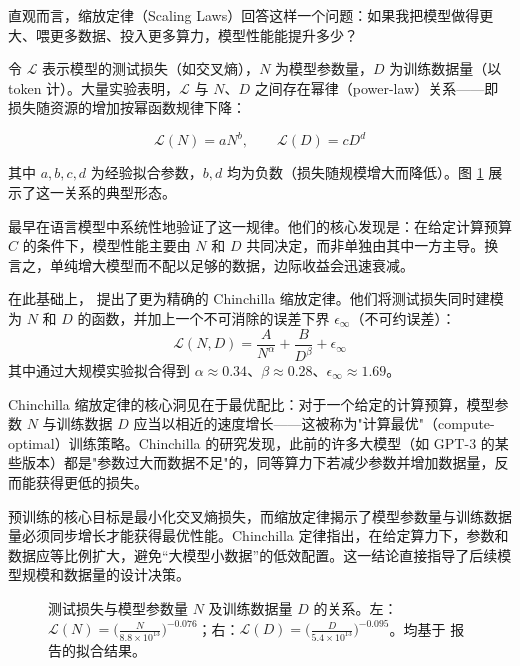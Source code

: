 直观而言，缩放定律（Scaling Laws）回答这样一个问题：如果我把模型做得更大、喂更多数据、投入更多算力，模型性能能提升多少？

令 $\mathcal{L}$ 表示模型的测试损失（如交叉熵），$N$ 为模型参数量，$D$ 为训练数据量（以 token 计）。大量实验表明，$\mathcal{L}$ 与 $N$、$D$ 之间存在幂律（power-law）关系——即损失随资源的增加按幂函数规律下降：

\begin{equation}
  \mathcal{L}(N) = aN^{b}, \qquad \mathcal{L}(D) = cD^{d}
  \label{eq:scaling-power-law-basic}
\end{equation}

其中 $a,b,c,d$ 为经验拟合参数，$b,d$ 均为负数（损失随规模增大而降低）。图 \ref{fig:power-law-scaling-for-model-size-and-dataset-size} 展示了这一关系的典型形态。

\cite{kaplan-etal:2020scaling} 最早在语言模型中系统性地验证了这一规律。他们的核心发现是：在给定计算预算 $C$ 的条件下，模型性能主要由 $N$ 和 $D$ 共同决定，而非单独由其中一方主导。换言之，单纯增大模型而不配以足够的数据，边际收益会迅速衰减。

在此基础上，\cite{hoffmann-etal:2022training} 提出了更为精确的 Chinchilla 缩放定律。他们将测试损失同时建模为 $N$ 和 $D$ 的函数，并加上一个不可消除的误差下界 $\epsilon_{\infty}$（不可约误差）：
\begin{equation}
  \mathcal{L}(N,D) = \frac{A}{N^{\alpha}} + \frac{B}{D^{\beta}} + \epsilon_{\infty}
  \label{eq:scaling-chinchilla}
\end{equation}
其中通过大规模实验拟合得到 $\alpha \approx 0.34$、$\beta \approx 0.28$、$\epsilon_{\infty} \approx 1.69$。

Chinchilla 缩放定律的核心洞见在于最优配比：对于一个给定的计算预算，模型参数 $N$ 与训练数据 $D$ 应当以相近的速度增长——这被称为"计算最优"（compute-optimal）训练策略。Chinchilla 的研究发现，此前的许多大模型（如 GPT-3 的某些版本）都是"参数过大而数据不足"的，同等算力下若减少参数并增加数据量，反而能获得更低的损失。

\begin{importantnote}
预训练的核心目标是最小化交叉熵损失，而缩放定律揭示了模型参数量与训练数据量必须同步增长才能获得最优性能。Chinchilla 定律指出，在给定算力下，参数和数据应等比例扩大，避免“大模型小数据”的低效配置。这一结论直接指导了后续模型规模和数据量的设计决策。
\end{importantnote}

\begin{figure}[!t]
\centering

\caption{测试损失与模型参数量 $N$ 及训练数据量 $D$ 的关系。左：$\mathcal{L}(N) = \big( \frac{N}{8.8 \times 10^{13}} \big)^{-0.076}$；右：$\mathcal{L}(D) = \big( \frac{D}{5.4 \times 10^{13}} \big)^{-0.095}$。均基于 \cite{kaplan-etal:2020scaling} 报告的拟合结果。}
\label{fig:power-law-scaling-for-model-size-and-dataset-size}
\end{figure}

